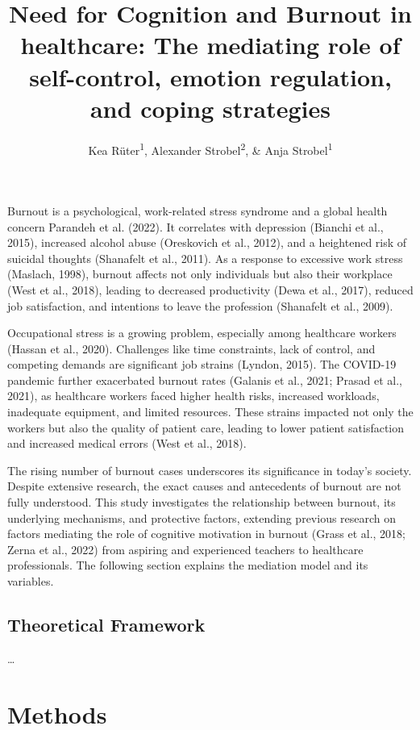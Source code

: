 \documentclass[
  man]{apa6}
\title{Need for Cognition and Burnout in healthcare: The mediating role of self-control, emotion regulation, and coping strategies}
\author{Kea Rüter\textsuperscript{1}, Alexander Strobel\textsuperscript{2}, \& Anja Strobel\textsuperscript{1}}
\date{}
\affiliation{\vspace{0.5cm}\textsuperscript{1} Department of Psychology, Technische Universität Chemnitz, Chemnitz, Germany\\\textsuperscript{2} Faculty of Psychology, Technische Universität Dresden, Dresden, Germany}
\begin{document}
\maketitle

Burnout is a psychological, work-related stress syndrome and a global health concern Parandeh et al. (2022).
It correlates with depression (Bianchi et al., 2015), increased alcohol abuse (Oreskovich et al., 2012), and a heightened risk of suicidal thoughts (Shanafelt et al., 2011).
As a response to excessive work stress (Maslach, 1998), burnout affects not only individuals but also their workplace (West et al., 2018), leading to decreased productivity (Dewa et al., 2017), reduced job satisfaction, and intentions to leave the profession (Shanafelt et al., 2009).

Occupational stress is a growing problem, especially among healthcare workers (Hassan et al., 2020).
Challenges like time constraints, lack of control, and competing demands are significant job strains (Lyndon, 2015).
The COVID-19 pandemic further exacerbated burnout rates (Galanis et al., 2021; Prasad et al., 2021), as healthcare workers faced higher health risks, increased workloads, inadequate equipment, and limited resources.
These strains impacted not only the workers but also the quality of patient care, leading to lower patient satisfaction and increased medical errors (West et al., 2018).

The rising number of burnout cases underscores its significance in today's society.
Despite extensive research, the exact causes and antecedents of burnout are not fully understood.
This study investigates the relationship between burnout, its underlying mechanisms, and protective factors, extending previous research on factors mediating the role of cognitive motivation in burnout (Grass et al., 2018; Zerna et al., 2022) from aspiring and experienced teachers to healthcare professionals.
The following section explains the mediation model and its variables.

\subsection{Theoretical Framework}\label{theoretical-framework}

\ldots{}

\section{Methods}\label{methods}
\end{document}

